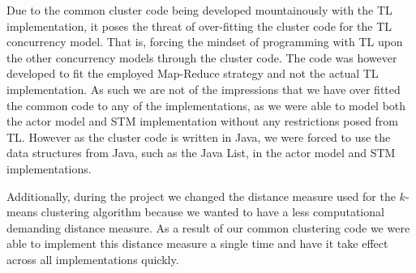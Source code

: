 Due to the common cluster code being developed mountainously with the \ac{TL} implementation, it poses the threat of over-fitting the cluster code for the \ac{TL} concurrency model. That is, forcing the mindset of programming with \ac{TL} upon the other concurrency models through the cluster code. The code was however developed to fit the employed Map-Reduce strategy and not the actual \ac{TL} implementation. As such we are not of the impressions that we have over fitted the common code to any of the implementations, as we were able to model both the actor model and \ac{STM} implementation without any restrictions posed from \ac{TL}. However as the cluster code is written in Java, we were forced to use the data structures from Java, such as the Java List, in the actor model and \ac{STM} implementations.

Additionally, during the project we changed the distance measure used for the $k$-means clustering algorithm because we wanted to have a less computational demanding distance measure. As a result of our common clustering code we were able to implement this distance measure a single time and have it take effect across all implementations quickly.


\worksheetend